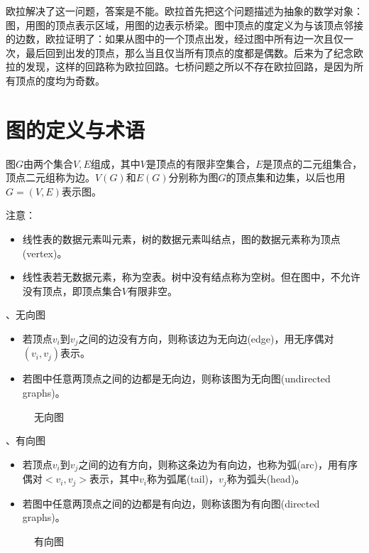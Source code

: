 \documentclass[10pt]{article}
\begin{document}
欧拉解决了这一问题，答案是不能。欧拉首先把这个问题描述为抽象的数学对象：图，用图的顶点表示区域，用图的边表示桥梁。图中顶点的度定义为与该顶点邻接的边数，欧拉证明了：如果从图中的一个顶点出发，经过图中所有边一次且仅一次，最后回到出发的顶点，那么当且仅当所有顶点的度都是偶数。后来为了纪念欧拉的发现，这样的回路称为欧拉回路。七桥问题之所以不存在欧拉回路，是因为所有顶点的度均为奇数。

\section{图的定义与术语}
图$G$由两个集合$V, E$组成，其中$V$是顶点的有限非空集合，$E$是顶点的二元组集合，顶点二元组称为边。$V(G)$和$E(G)$分别称为图$G$的顶点集和边集，以后也用$G=(V,E)$表示图。

\begin{figure}[htbp]
\centering

\end{figure}

注意：
\begin{itemize}
\item 
线性表的数据元素叫元素，树的数据元素叫结点，图的数据元素称为顶点(vertex)。 
\item 
线性表若无数据元素，称为空表。树中没有结点称为空树。但在图中，不允许没有顶点，即顶点集合$V$有限非空。
\end{itemize}

、无向图
\begin{itemize}
\item 
若顶点$v_i$到$v_j$之间的边没有方向，则称该边为无向边(edge)，用无序偶对$(v_i,v_j)$表示。 
\item
若图中任意两顶点之间的边都是无向边，则称该图为无向图(undirected graphs)。
\end{itemize}

\begin{figure}[htbp]
\centering

\caption{无向图}
\end{figure}

、有向图
\begin{itemize}
\item 
若顶点$v_i$到$v_j$之间的边有方向，则称这条边为有向边，也称为弧(arc)，用有序偶对$<v_i,v_j>$表示，其中$v_i$称为弧尾(tail)，$v_j$称为弧头(head)。 
\item
若图中任意两顶点之间的边都是有向边，则称该图为有向图(directed graphs)。
\end{itemize}

\begin{figure}
\centering

\caption{有向图}
\end{figure}
\end{document}
